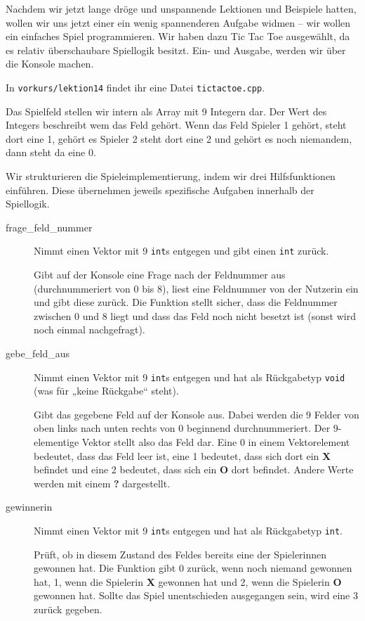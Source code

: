 
Nachdem wir jetzt lange dröge und unspannende Lektionen und Beispiele hatten, wollen wir uns jetzt einer
ein wenig spannenderen Aufgabe widmen -- wir wollen ein
einfaches Spiel programmieren. Wir haben dazu Tic Tac Toe ausgewählt, da es
relativ überschaubare Spiellogik besitzt. Ein- und Ausgabe, werden wir über die
Konsole machen.

In \texttt{vorkurs/lektion14} findet ihr eine Datei \texttt{tictactoe.cpp}.

Das Spielfeld stellen wir intern als Array mit 9 Integern dar. Der Wert des Integers beschreibt wem das Feld gehört.
Wenn das Feld Spieler 1 gehört, steht dort eine 1, gehört es Spieler 2 steht dort eine 2 und gehört es noch niemandem,
dann steht da eine 0.

Wir strukturieren die Spieleimplementierung, indem wir drei Hilfsfunktionen einführen. Diese übernehmen jeweils spezifische Aufgaben innerhalb der Spiellogik.

\begin{description}
	\item[frage\_feld\_nummer]
	      Nimmt einen Vektor mit 9 \texttt{int}s entgegen und gibt einen \texttt{int} zurück.

	      Gibt auf der Konsole eine Frage nach der Feldnummer aus (durchnummeriert von 0 bis 8), liest eine Feldnummer von der Nutzerin ein und gibt diese zurück.
	      Die Funktion stellt sicher, dass die Feldnummer zwischen 0 und 8 liegt und dass das Feld noch nicht besetzt ist (sonst wird noch einmal nachgefragt).
	\item[gebe\_feld\_aus]
	      Nimmt einen Vektor mit 9 \texttt{int}s entgegen und hat als Rückgabetyp \texttt{void} (was für „keine Rückgabe“ steht).

	      Gibt das gegebene Feld auf der Konsole aus. Dabei werden die 9 Felder von oben links nach unten rechts von 0 beginnend durchnummeriert.
	      Der 9-elementige Vektor stellt also das Feld dar.
	      Eine 0 in einem Vektorelement bedeutet, dass das Feld leer ist, eine 1 bedeutet, dass sich dort ein \textbf{X} befindet und eine 2 bedeutet, dass sich ein \textbf{O} dort befindet.
	      Andere Werte werden mit einem \textbf{?} dargestellt.
	\item[gewinnerin]
	      Nimmt einen Vektor mit 9 \texttt{int}s entgegen und hat als Rückgabetyp \texttt{int}.

	      Prüft, ob in diesem Zustand des Feldes bereits eine der Spielerinnen gewonnen hat.
	      Die Funktion gibt 0 zurück, wenn noch niemand gewonnen hat, 1, wenn die Spielerin \textbf{X} gewonnen hat und 2, wenn die Spielerin \textbf{O} gewonnen hat.
	      Sollte das Spiel unentschieden ausgegangen sein, wird eine 3 zurück gegeben.
\end{description}



